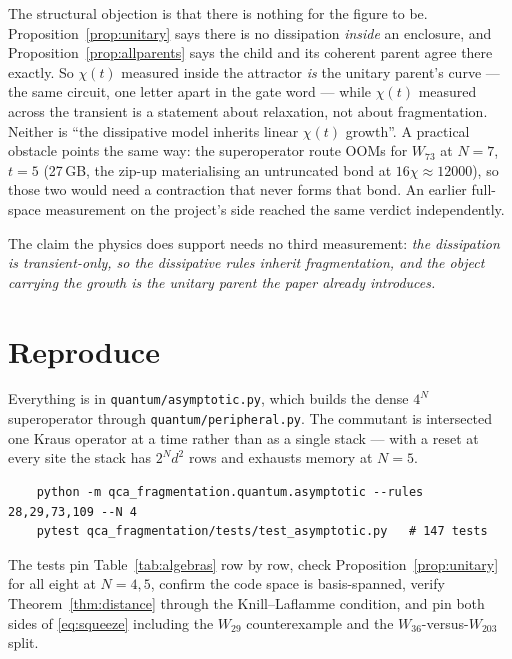 \documentclass[11pt]{article}
\newcommand{\fn}[1]{\texttt{#1}}
\theoremstyle{plain}
\theoremstyle{remark}
\begin{document}
\begin{enumerate}
The structural objection is that there is nothing for the figure to be.
Proposition~\ref{prop:unitary} says there is no dissipation \emph{inside} an
enclosure, and Proposition~\ref{prop:allparents} says the child and its coherent
parent agree there exactly. So $\chi(t)$ measured inside the attractor
\emph{is} the unitary parent's curve --- the same circuit, one letter apart in
the gate word --- while $\chi(t)$ measured across the transient is a statement
about relaxation, not about fragmentation. Neither is ``the dissipative model
inherits linear $\chi(t)$ growth''. A practical obstacle points the same way:
the superoperator route OOMs for $W_{73}$ at $N=7$, $t=5$ (27\,GB, the zip-up
materialising an untruncated bond at $16\chi \approx 12000$), so those two would
need a contraction that never forms that bond. An earlier full-space measurement
on the project's side reached the same verdict independently.

The claim the physics does support needs no third measurement:
\emph{the dissipation is transient-only, so the dissipative rules inherit
fragmentation, and the object carrying the growth is the unitary parent the
paper already introduces.}
\end{enumerate}

\section*{Reproduce}

Everything is in \fn{quantum/asymptotic.py}, which builds the dense $4^N$
superoperator through \fn{quantum/peripheral.py}. The commutant is intersected
one Kraus operator at a time rather than as a single stack --- with a reset at
every site the stack has $2^N d^2$ rows and exhausts memory at $N=5$.

\begin{verbatim}
    python -m qca_fragmentation.quantum.asymptotic --rules 28,29,73,109 --N 4
    pytest qca_fragmentation/tests/test_asymptotic.py   # 147 tests
\end{verbatim}

\noindent The tests pin Table~\ref{tab:algebras} row by row, check
Proposition~\ref{prop:unitary} for all eight at $N=4,5$, confirm the code space
is basis-spanned, verify Theorem~\ref{thm:distance} through the
Knill--Laflamme condition, and pin both sides of \eqref{eq:squeeze} including
the $W_{29}$ counterexample and the $W_{36}$-versus-$W_{203}$ split.
\end{document}
